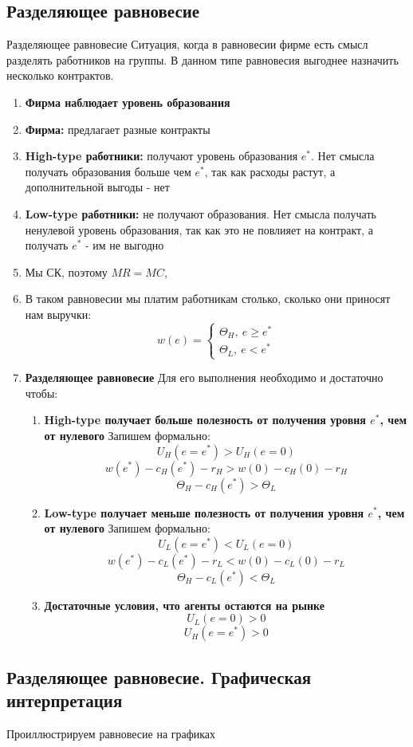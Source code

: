 \subsection{Разделяющее равновесие}
\begin{mybox}{Разделяющее равновесие}
Ситуация, когда в равновесии фирме есть смысл разделять работников на группы. В данном типе равновесия
выгоднее назначить несколько контрактов.
\end{mybox}
\begin{enumerate}
    \item \textbf{Фирма наблюдает уровень образования}
    \item \textbf{Фирма:} предлагает разные контракты
    \item \textbf{High-type работники:} получают уровень образования $e^*$. Нет смысла получать образования больше чем $e^*$, так как расходы растут, а дополнительной выгоды - нет
    \item \textbf{Low-type работники:} не получают образования. Нет смысла получать ненулевой уровень образования, так как это не повлияет на контракт, а получать $e^*$ - им не выгодно
    \item Мы СК, поэтому $MR=MC$,
    \item В таком равновесии мы платим работникам столько, сколько они приносят нам выручки: $$w(e)=\begin{cases}
        \Theta_H, \ e \geq e^* \\
        \Theta_L, \ e < e^*
    \end{cases}$$
    \item \textbf{Разделяющее равновесие} Для его выполнения необходимо и достаточно чтобы:\begin{enumerate}
        \item \textbf{High-type получает больше полезность от получения уровня $e^*$, чем от нулевого} Запишем формально:$$U_H(e=e^*)>U_H(e=0)$$
        $$w(e^*)-c_H(e^*)-r_H>w(0)-c_H(0)-r_H$$
        $$\Theta_H-c_H(e^*)>\Theta_L$$
        \item \textbf{Low-type получает меньше полезность от получения уровня $e^*$, чем от нулевого} Запишем формально:$$U_L(e=e^*)<U_L(e=0)$$
        $$w(e^*)-c_L(e^*)-r_L<w(0)-c_L(0)-r_L$$
        $$\Theta_H-c_L(e^*)<\Theta_L$$
        \item \textbf{Достаточные условия, что агенты остаются на рынке} $$U_L(e=0)>0$$
        $$U_H(e=e^*)>0$$
    \end{enumerate}
\end{enumerate}
\subsection{Разделяющее равновесие. Графическая интерпретация}
\indent\setlength{\parindent}{1em}Проиллюстрируем равновесие на графиках
